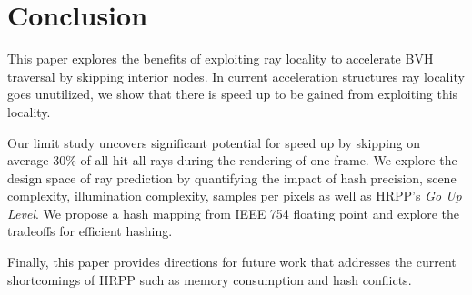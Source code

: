 \section{Conclusion}
This paper explores the benefits of exploiting ray locality to accelerate BVH traversal by skipping interior nodes. In current acceleration structures ray locality goes unutilized, we show that there is speed up to be gained from exploiting this locality. 

Our limit study uncovers significant potential for speed up by skipping on average 30\% of all hit-all rays during the rendering of one frame. 
We explore the design space of ray prediction by quantifying the impact of hash precision, scene complexity, illumination complexity, samples per pixels as well as HRPP's \textit{Go Up Level}. We propose a hash mapping from IEEE 754 floating point and explore the tradeoffs for efficient hashing. 

Finally, this paper provides directions for future work that addresses the current shortcomings of HRPP such as memory consumption and hash conflicts.